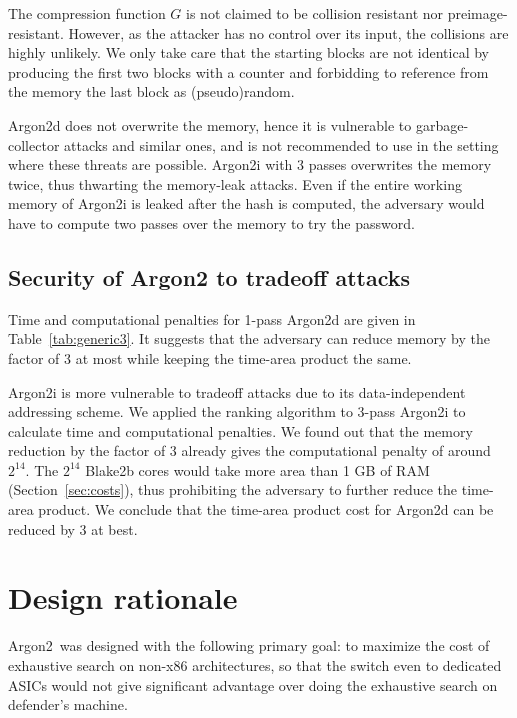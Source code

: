 \documentclass[a4paper]{article}
\begin{document}
 The compression function $G$ is not claimed to be collision resistant nor preimage-resistant. However, as the attacker has no control over its input, the collisions are highly unlikely. We only take care that the starting blocks are not identical by producing the first two blocks with a counter and forbidding to reference from the memory the last block as (pseudo)random.

\textsf{Argon2d} does not overwrite the memory, hence it is vulnerable to garbage-collector attacks and similar ones, and is not recommended to use in the setting where these threats are possible. \textsf{Argon2i} with 3 passes overwrites the memory twice, thus thwarting the memory-leak attacks. Even if the entire working memory of \textsf{Argon2i} is leaked after the hash is computed, the adversary would have to compute two passes over the memory to try the password.



\subsection{Security of Argon2 to tradeoff attacks}

Time and computational penalties for 1-pass \textsf{Argon2d} are given in Table~\ref{tab:generic3}. It suggests that the adversary can reduce memory by the factor of 3 at most
while keeping the time-area product the same.

\textsf{Argon2i} is more vulnerable to tradeoff attacks due to its data-independent addressing scheme. We applied the ranking algorithm to 3-pass \textsf{Argon2i} to calculate time and computational penalties. We found out  that the memory reduction by the factor of 3 already gives the computational penalty of around $2^{14}$.  The $2^{14}$ Blake2b cores would take more area than 1 GB of RAM (Section~\ref{sec:costs}), thus prohibiting the adversary to further reduce the time-area product. We conclude that the time-area product cost for \textsf{Argon2d} can be reduced by 3 at best.




  \section{Design rationale}

  \textsf{Argon2}\ was designed with the following primary goal: to maximize the cost of exhaustive search on non-x86 architectures, so that the switch even to dedicated ASICs would not give significant advantage over doing the exhaustive search on defender's machine.
\end{document}
